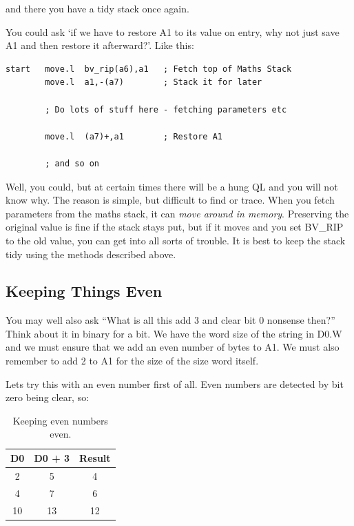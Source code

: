and there you have a tidy stack once again.

You could ask `if we have to restore A1 to its value on entry, why
    not just save A1 and then restore it afterward?'. Like this:

\begin{lstlisting}[firstnumber=1,caption={How to Hang the QL},label={lst:HowToHangTheQL}]
start   move.l  bv_rip(a6),a1   ; Fetch top of Maths Stack
        move.l  a1,-(a7)        ; Stack it for later

        ; Do lots of stuff here - fetching parameters etc

        move.l  (a7)+,a1        ; Restore A1

        ; and so on
\end{lstlisting}

Well, you could, but at certain times there will be a hung QL and
    you will not know why. The reason is simple, but difficult to find or
    trace. When you fetch parameters from the maths stack, it can \emph{move around in memory}. Preserving the original value is fine if the stack stays put, but
    if it moves and you set BV\_RIP to the old value, you can get into all
    sorts of trouble. It is best to keep the stack tidy using the methods
    described above.

\subsection{Keeping Things Even}
\label{ch7-keep-things-even}%

You may well also ask ``What is all this add 3 and clear bit 0
      nonsense then?'' Think about it in binary for a bit. We have the word
      size of the string in D0.W and we must ensure that we add an even number
      of bytes to A1. We must also remember to add 2 to A1 for the size of the
      size word itself.

Lets try this with an even number first of all. Even numbers are
      detected by bit zero being clear, so:
\begin{table}[htbp]
\centering
\begin{tabular}{c c c}  %
\toprule
\textbf{D0} & \textbf{D0 + 3} & \textbf{Result} \\
\midrule
%
2 & 5 & 4\\
4 & 7 & 6\\
10 & 13 & 12\\
%
\bottomrule
\end{tabular}
\caption{Keeping even numbers even.}
\label{tab:KeepingEvenNumbersEven}
\end{table}

